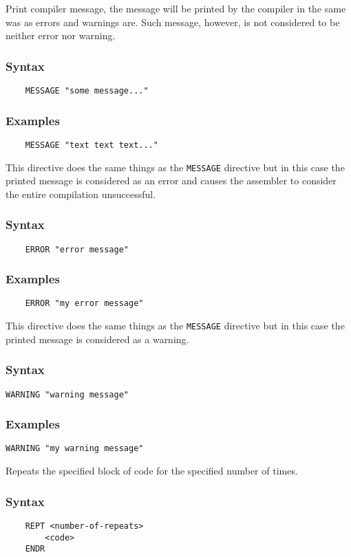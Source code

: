     Print compiler message, the message will be printed by the compiler in the same was as errors and warnings are. Such message, however, is not considered to be neither error nor warning.

    \subsubsection{Syntax}
        \verb'    MESSAGE "some message..."'

    \subsubsection{Examples}
        \verb'    MESSAGE "text text text..."'

    This directive does the same things as the \texttt{MESSAGE} directive but in this case the printed message is considered as an error and causes the assembler to consider the entire compilation unsuccessful.

    \subsubsection{Syntax}
        \verb'    ERROR "error message"'

    \subsubsection{Examples}
        \verb'    ERROR "my error message"'

    This directive does the same things as the \texttt{MESSAGE} directive but in this case the printed message is considered as a warning.

    \subsubsection{Syntax}
        \verb'WARNING "warning message"'

    \subsubsection{Examples}
        \verb'WARNING "my warning message"'

    Repeats the specified block of code for the specified number of times.

    \subsubsection{Syntax}
        \verb'    REPT <number-of-repeats>'\\
        \verb'        <code>'\\
        \verb'    ENDR'

